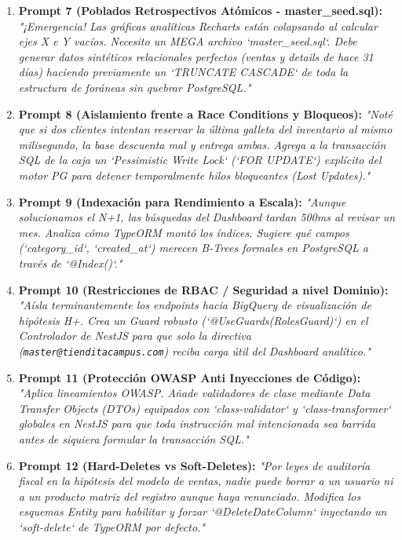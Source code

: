 \documentclass[12pt,a4paper]{article}
\begin{document}
\begin{enumerate}
    \item \textbf{Prompt 7 (Poblados Retrospectivos Atómicos - master\_seed.sql):} \textit{"¡Emergencia! Las gráficas analíticas Recharts están colapsando al calcular ejes X e Y vacíos. Necesito un MEGA archivo `master\_seed.sql`. Debe generar datos sintéticos relacionales perfectos (ventas y details de hace 31 días) haciendo previamente un `TRUNCATE CASCADE` de toda la estructura de foráneas sin quebrar PostgreSQL."}

    \item \textbf{Prompt 8 (Aislamiento frente a Race Conditions y Bloqueos):} \textit{"Noté que si dos clientes intentan reservar la última galleta del inventario al mismo milisegundo, la base descuenta mal y entrega ambas. Agrega a la transacción SQL de la caja un `Pessimistic Write Lock` (`FOR UPDATE`) explícito del motor PG para detener temporalmente hilos bloqueantes (Lost Updates)."}

    \item \textbf{Prompt 9 (Indexación para Rendimiento a Escala):} \textit{"Aunque solucionamos el N+1, las búsquedas del \textit{Dashboard} tardan 500ms al revisar un mes. Analiza cómo TypeORM montó los índices. Sugiere qué campos (`category\_id`, `created\_at`) merecen B-Trees formales en PostgreSQL a través de `@Index()`."}
    
    \item \textbf{Prompt 10 (Restricciones de RBAC / Seguridad a nivel Dominio):} \textit{"Aísla terminantemente los endpoints hacia BigQuery de visualización de hipótesis H+. Crea un Guard robusto (`@UseGuards(RolesGuard)`) en el Controlador de NestJS para que solo la directiva (\texttt{master@tienditacampus.com}) reciba carga útil del Dashboard analítico."}
    
    \item \textbf{Prompt 11 (Protección OWASP Anti Inyecciones de Código):} \textit{"Aplica lineamientos OWASP. Añade validadores de clase mediante Data Transfer Objects (DTOs) equipados con `class-validator` y `class-transformer` globales en NestJS para que toda instrucción mal intencionada sea barrida antes de siquiera formular la transacción SQL."}
    
    \item \textbf{Prompt 12 (Hard-Deletes vs Soft-Deletes):} \textit{"Por leyes de auditoría fiscal en la hipótesis del modelo de ventas, nadie puede borrar a un usuario ni a un producto matriz del registro aunque haya renunciado. Modifica los esquemas Entity para habilitar y forzar `@DeleteDateColumn` inyectando un `soft-delete` de TypeORM por defecto."}


\end{enumerate}
\end{document}
